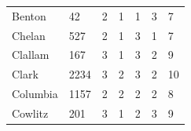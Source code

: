 \documentclass{mcmthesis}
\numberwithin{figure}{section}
\numberwithin{table}{section}
\begin{document}
\begin{table}[H]
\begin{tabular}{lllllll}
  Benton       & 42                                                     & 2                                                                             & 1                                                                 & 1                                                                           & 3                                                                                     & 7                                                                          \\
  Chelan       & 527                                                    & 2                                                                             & 1                                                                 & 3                                                                           & 1                                                                                     & 7                                                                          \\
  Clallam      & 167                                                    & 3                                                                             & 1                                                                 & 3                                                                           & 2                                                                                     & 9                                                                          \\
  Clark        & 2234                                                   & 3                                                                             & 2                                                                 & 3                                                                           & 2                                                                                     & 10                                                                         \\
  Columbia     & 1157                                                   & 2                                                                             & 2                                                                 & 2                                                                           & 2                                                                                     & 8                                                                          \\
  Cowlitz      & 201                                                    & 3                                                                             & 1                                                                 & 2                                                                           & 3                                                                                     & 9                                                                          \\

\end{tabular}
\end{table}
\end{document}
